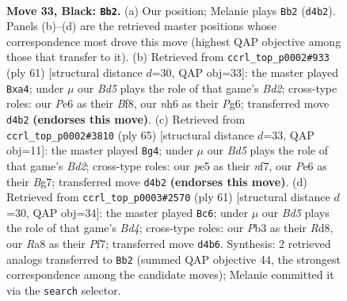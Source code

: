 \documentclass[11pt]{article}
\begin{document}
\clearpage

\begin{figure}[p]\centering
\begin{subfigure}{0.46\textwidth}\centering
\resizebox{\linewidth}{!}{%
\newchessgame
\chessboard[
  setfen={r7/3k4/b1p1p2N/P3P2p/R2b1P1P/1p6/7K/1N6 b - - 1 33},
  showmover=false,
  pgfstyle=straightmove, color=movearrow, markmove={d4-b2}
]}
\caption{}
\end{subfigure}\hfill
\begin{subfigure}{0.46\textwidth}\centering
\resizebox{\linewidth}{!}{%
\newchessgame
\chessboard[
  setfen={5bk1/1R1b3p/6p1/p1pPp3/P1P4P/5P2/6P1/5K2 b - - 3 31},
  showmover=false,
  pgfstyle=straightmove, color=movearrow, markmove={d7-a4}
]}
\caption{}
\end{subfigure}
\\[4pt]
\begin{subfigure}{0.46\textwidth}\centering
\resizebox{\linewidth}{!}{%
\newchessgame
\chessboard[
  setfen={8/2Rb1Nbk/3p2p1/7p/2PpP2P/3r2P1/6B1/6K1 b - - 0 33},
  showmover=false,
  pgfstyle=straightmove, color=movearrow, markmove={d7-g4}
]}
\caption{}
\end{subfigure}\hfill
\begin{subfigure}{0.46\textwidth}\centering
\resizebox{\linewidth}{!}{%
\newchessgame
\chessboard[
  setfen={3r4/2k2p2/5N1p/p2b4/1p5P/3PpP2/1PP5/2K1R3 b - - 1 31},
  showmover=false,
  pgfstyle=straightmove, color=movearrow, markmove={d5-c6}
]}
\caption{}
\end{subfigure}
\caption{\textbf{Move 33, Black: \texttt{Bb2}.} (a) Our position; Melanie plays \texttt{Bb2} (\texttt{d4b2}). Panels (b)--(d) are the retrieved master positions whose correspondence most drove this move (highest QAP objective among those that transfer to it). (b) Retrieved from \texttt{ccrl\_top\_p0002\#933} (ply 61) [structural distance $d$=30, QAP obj=33]: the master played \texttt{Bxa4}; under $\mu$ our \emph{Bd5} plays the role of that game's \emph{Bd2}; cross-type roles: our \emph{P}e6 as their \emph{B}f8, our \emph{n}h6 as their \emph{P}g6; transferred move \texttt{d4b2} \textbf{(endorses this move)}. (c) Retrieved from \texttt{ccrl\_top\_p0002\#3810} (ply 65) [structural distance $d$=33, QAP obj=11]: the master played \texttt{Bg4}; under $\mu$ our \emph{Bd5} plays the role of that game's \emph{Bd2}; cross-type roles: our \emph{p}e5 as their \emph{n}f7, our \emph{P}e6 as their \emph{B}g7; transferred move \texttt{d4b2} \textbf{(endorses this move)}. (d) Retrieved from \texttt{ccrl\_top\_p0003\#2570} (ply 61) [structural distance $d$=30, QAP obj=34]: the master played \texttt{Bc6}; under $\mu$ our \emph{Bd5} plays the role of that game's \emph{Bd4}; cross-type roles: our \emph{P}b3 as their \emph{R}d8, our \emph{R}a8 as their \emph{P}f7; transferred move \texttt{d4b6}. Synthesis: 2 retrieved analogs transferred to \texttt{Bb2} (summed QAP objective 44, the strongest correspondence among the candidate moves); Melanie committed it via the \texttt{search} selector.}
\label{fig:thought-m65}
\end{figure}
\end{document}
